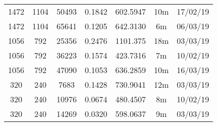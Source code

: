 \begin{center}
\begin{tabular}{ c c c | c | c c c }
  1472 & 1104 & 50493 & 0.1842 & 602.5947 & 10m & 17/02/19 \\
  1472 & 1104 & 65641 & 0.1205 & 642.3130 & 6m & 06/03/19 \\
  1056 & 792 & 25356 & 0.2476 & 1101.375 & 18m & 03/03/19 \\
  1056 & 792 & 36223 & 0.1574 & 423.7316 & 7m & 10/02/19 \\
  1056 & 792 & 47090 & 0.1053 & 636.2859 & 10m & 16/03/19 \\
  320 & 240 & 7683 & 0.1428 & 730.9041 & 12m & 03/03/19 \\
  320 & 240 & 10976 & 0.0674 & 480.4507 & 8m & 10/02/19 \\
  320 & 240 & 14269 & 0.0320 & 598.0637 & 9m & 03/03/19 \\
  \end{tabular}
  \end{center}